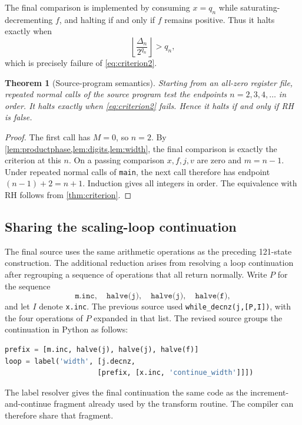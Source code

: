 \documentclass[10pt]{article}
\newtheorem{theorem}{Theorem}[section]
\theoremstyle{definition}
\begin{document}
The final comparison is implemented by consuming $x=q_n$ while
saturating-decrementing $f$, and halting if and only if $f$ remains positive.
Thus it halts exactly when
\[
\left\lfloor\frac{\Delta_n}{2^{q_n}}\right\rfloor>q_n,
\]
which is precisely failure of \eqref{eq:criterion2}.

\begin{theorem}[Source-program semantics]
\label{thm:source}
Starting from an all-zero register file, repeated normal calls of the source
program test the endpoints $n=2,3,4,\ldots$ in order. It halts exactly when
\eqref{eq:criterion2} fails. Hence it halts if and only if RH is false.
\end{theorem}

\begin{proof}
The first call has $M=0$, so $n=2$. By
\cref{lem:productphase,lem:digits,lem:width}, the final comparison is exactly
the criterion at this $n$. On a passing comparison $x,f,j,v$ are zero and
$m=n-1$. Under repeated normal calls of \texttt{main}, the next call therefore
has endpoint $(n-1)+2=n+1$. Induction gives all integers in order. The
equivalence with RH follows from \cref{thm:criterion}.
\end{proof}

\subsection{Sharing the scaling-loop continuation}
\label{sec:tailsharing}

The final source uses the same arithmetic operations as the preceding
121-state construction. The additional reduction arises from resolving a
loop continuation after regrouping a sequence of operations that all return
normally. Write $P$ for the sequence
\[
\texttt{m.inc},\quad\texttt{halve(j)},\quad
\texttt{halve(j)},\quad\texttt{halve(f)},
\]
and let $I$ denote \texttt{x.inc}. The previous source used
\texttt{while\_decnz(j,[P,I])}, with the four operations of $P$ expanded in
that list. The revised source groups the continuation in Python as
follows:
\begin{lstlisting}[language=Python]
prefix = [m.inc, halve(j), halve(j), halve(f)]
loop = label('width', [j.decnz,
                      [prefix, [x.inc, 'continue_width']]])
\end{lstlisting}
The label resolver gives the final continuation the same code as the
increment-and-continue fragment already used by the transform routine.
The compiler can therefore share that fragment.
\end{document}
